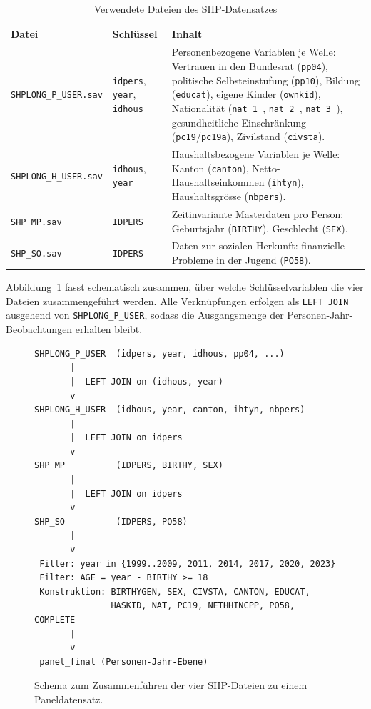 \begin{table}[h]
\centering
\caption{Verwendete Dateien des SHP-Datensatzes}
\label{tab:dateien}
\renewcommand{\arraystretch}{1.2}
\begin{tabularx}{\textwidth}{@{}p{2.8cm} p{2.6cm} X@{}}
\toprule
Datei & Schlüssel & Inhalt \\
\midrule
\texttt{SHPLONG\_P\_\allowbreak USER.sav} &
\texttt{idpers}, \texttt{year}, \texttt{idhous} &
Personenbezogene Variablen je Welle: Vertrauen in den Bundesrat (\texttt{pp04}), politische Selbsteinstufung (\texttt{pp10}), Bildung (\texttt{educat}), eigene Kinder (\texttt{ownkid}), Nationalität (\texttt{nat\_1\_}, \texttt{nat\_2\_}, \texttt{nat\_3\_}), gesundheitliche Einschränkung (\texttt{pc19}/\texttt{pc19a}), Zivilstand (\texttt{civsta}). \\
\addlinespace
\texttt{SHPLONG\_H\_\allowbreak USER.sav} &
\texttt{idhous}, \texttt{year} &
Haushaltsbezogene Variablen je Welle: Kanton (\texttt{canton}), Netto-Haushaltseinkommen (\texttt{ihtyn}), Haushaltsgrösse (\texttt{nbpers}). \\
\addlinespace
\texttt{SHP\_MP.sav} &
\texttt{IDPERS} &
Zeitinvariante Masterdaten pro Person: Geburtsjahr (\texttt{BIRTHY}), Geschlecht (\texttt{SEX}). \\
\addlinespace
\texttt{SHP\_SO.sav} &
\texttt{IDPERS} &
Daten zur sozialen Herkunft: finanzielle Probleme in der Jugend (\texttt{PO58}). \\
\bottomrule
\end{tabularx}
\end{table}

Abbildung~\ref{fig:joinschema} fasst schematisch zusammen, über welche
Schlüsselvariablen die vier Dateien zusammengeführt werden. Alle Verknüpfungen
erfolgen als \texttt{LEFT JOIN} ausgehend von \texttt{SHPLONG\_P\_USER}, sodass die
Ausgangsmenge der Personen-Jahr-Beobachtungen erhalten bleibt.

\begin{figure}[h]
\centering
\begin{lstlisting}[basicstyle=\ttfamily\small, frame=single, backgroundcolor=\color{white}, numbers=none]
SHPLONG_P_USER  (idpers, year, idhous, pp04, ...)
       |
       |  LEFT JOIN on (idhous, year)
       v
SHPLONG_H_USER  (idhous, year, canton, ihtyn, nbpers)
       |
       |  LEFT JOIN on idpers
       v
SHP_MP          (IDPERS, BIRTHY, SEX)
       |
       |  LEFT JOIN on idpers
       v
SHP_SO          (IDPERS, PO58)
       |
       v
 Filter: year in {1999..2009, 2011, 2014, 2017, 2020, 2023}
 Filter: AGE = year - BIRTHY >= 18
 Konstruktion: BIRTHYGEN, SEX, CIVSTA, CANTON, EDUCAT,
               HASKID, NAT, PC19, NETHHINCPP, PO58, COMPLETE
       |
       v
 panel_final (Personen-Jahr-Ebene)
\end{lstlisting}
\caption{Schema zum Zusammenführen der vier SHP-Dateien zu einem Paneldatensatz.}
\label{fig:joinschema}
\end{figure}

